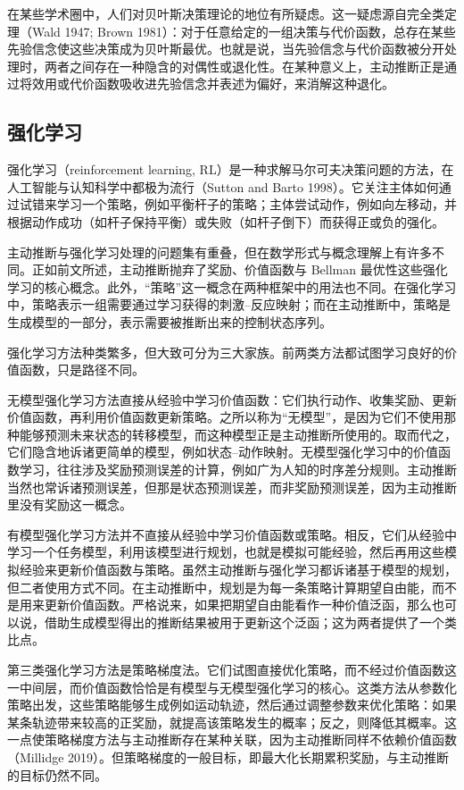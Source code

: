 在某些学术圈中，人们对贝叶斯决策理论的地位有所疑虑。这一疑虑源自完全类定理（Wald 1947; Brown 1981）：对于任意给定的一组决策与代价函数，总存在某些先验信念使这些决策成为贝叶斯最优。也就是说，当先验信念与代价函数被分开处理时，两者之间存在一种隐含的对偶性或退化性。在某种意义上，主动推断正是通过将效用或代价函数吸收进先验信念并表述为偏好，来消解这种退化。

\subsection{强化学习}

强化学习（reinforcement learning, RL）是一种求解马尔可夫决策问题的方法，在人工智能与认知科学中都极为流行（Sutton and Barto 1998）。它关注主体如何通过试错来学习一个策略，例如平衡杆子的策略；主体尝试动作，例如向左移动，并根据动作成功（如杆子保持平衡）或失败（如杆子倒下）而获得正或负的强化。

主动推断与强化学习处理的问题集有重叠，但在数学形式与概念理解上有许多不同。正如前文所述，主动推断抛弃了奖励、价值函数与 Bellman 最优性这些强化学习的核心概念。此外，“策略”这一概念在两种框架中的用法也不同。在强化学习中，策略表示一组需要通过学习获得的刺激--反应映射；而在主动推断中，策略是生成模型的一部分，表示需要被推断出来的控制状态序列。

强化学习方法种类繁多，但大致可分为三大家族。前两类方法都试图学习良好的价值函数，只是路径不同。

无模型强化学习方法直接从经验中学习价值函数：它们执行动作、收集奖励、更新价值函数，再利用价值函数更新策略。之所以称为“无模型”，是因为它们不使用那种能够预测未来状态的转移模型，而这种模型正是主动推断所使用的。取而代之，它们隐含地诉诸更简单的模型，例如状态--动作映射。无模型强化学习中的价值函数学习，往往涉及奖励预测误差的计算，例如广为人知的时序差分规则。主动推断当然也常诉诸预测误差，但那是状态预测误差，而非奖励预测误差，因为主动推断里没有奖励这一概念。

有模型强化学习方法并不直接从经验中学习价值函数或策略。相反，它们从经验中学习一个任务模型，利用该模型进行规划，也就是模拟可能经验，然后再用这些模拟经验来更新价值函数与策略。虽然主动推断与强化学习都诉诸基于模型的规划，但二者使用方式不同。在主动推断中，规划是为每一条策略计算期望自由能，而不是用来更新价值函数。严格说来，如果把期望自由能看作一种价值泛函，那么也可以说，借助生成模型得出的推断结果被用于更新这个泛函；这为两者提供了一个类比点。

第三类强化学习方法是策略梯度法。它们试图直接优化策略，而不经过价值函数这一中间层，而价值函数恰恰是有模型与无模型强化学习的核心。这类方法从参数化策略出发，这些策略能够生成例如运动轨迹，然后通过调整参数来优化策略：如果某条轨迹带来较高的正奖励，就提高该策略发生的概率；反之，则降低其概率。这一点使策略梯度方法与主动推断存在某种关联，因为主动推断同样不依赖价值函数（Millidge 2019）。但策略梯度的一般目标，即最大化长期累积奖励，与主动推断的目标仍然不同。

